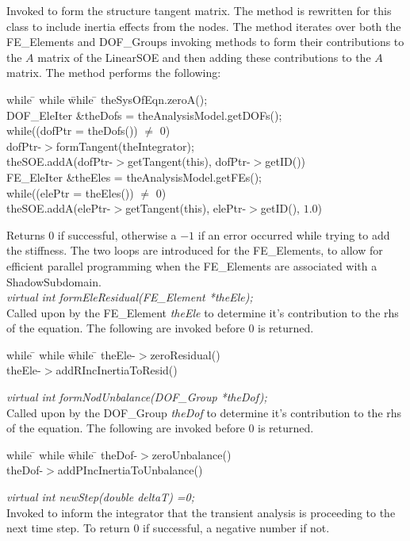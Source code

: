 Invoked to form the structure tangent matrix. The method is rewritten
for this class to include inertia effects from the nodes. The method
iterates over both the FE\_Elements and DOF\_Groups invoking methods
to form their contributions to the $A$ matrix of the LinearSOE and
then adding these contributions to the $A$ matrix. The method performs
the following:
\begin{tabbing}
while \= \+ while \= while \= \kill
theSysOfEqn.zeroA();\\
DOF\_EleIter \&theDofs = theAnalysisModel.getDOFs();\\
while((dofPtr = theDofs()) $\neq$ 0) \+ \\
dofPtr-$>$formTangent(theIntegrator); \\
theSOE.addA(dofPtr-$>$getTangent(this),
dofPtr-$>$getID()) \- \\
FE\_EleIter \&theEles = theAnalysisModel.getFEs();\\
while((elePtr = theEles()) $\neq$ 0) \+ \\
theSOE.addA(elePtr-$>$getTangent(this),
elePtr-$>$getID(), $1.0$) \\
\end{tabbing}
\noindent Returns $0$ if successful, otherwise a $-1$ if an error occurred while
trying to add the stiffness. The two loops are introduced for the
FE\_Elements, to allow for efficient parallel programming when the
FE\_Elements are associated with a ShadowSubdomain.\\ 

{\em virtual int formEleResidual(FE\_Element *theEle);} \\
Called upon by the FE\_Element {\em theEle} to determine it's
contribution to the rhs of the equation. The following are invoked
before $0$ is returned.
\begin{tabbing}
while \= \+ while \= while \= \kill
theEle-$>$zeroResidual() \\
theEle-$>$addRIncInertiaToResid() \\
\end{tabbing}

{\em virtual int formNodUnbalance(DOF\_Group *theDof);} \\
Called upon by the DOF\_Group {\em theDof} to determine it's
contribution to the rhs of the equation. The following are invoked
before $0$ is returned.
\begin{tabbing}
while \= \+ while \= while \= \kill
theDof-$>$zeroUnbalance() \\
theDof-$>$addPIncInertiaToUnbalance() \\
\end{tabbing}

{\em virtual int newStep(double deltaT) =0;} \\
Invoked to inform the integrator that the transient analysis is
proceeding to the next time step. To return $0$ if successful, a
negative number if not.\\




